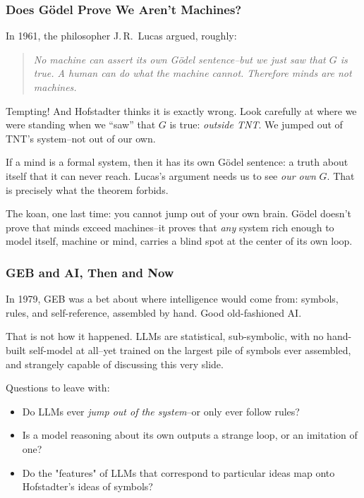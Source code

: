 \documentclass[aspectratio=169]{beamer}
\begin{document}
\begin{frame}[fragile]
  \frametitle{Does G\"odel Prove We Aren't Machines?}

  In 1961, the philosopher J.\,R.\ Lucas argued, roughly:

  \begin{quote}
    {\small\itshape No machine can assert its own G\"odel
    sentence--but we just saw that $G$ is true. A human can do what
    the machine cannot. Therefore minds are not machines.}
  \end{quote}

  \pause
  \vspace{\fill}

  Tempting! And Hofstadter thinks it is exactly wrong. Look carefully
  at where we were standing when we ``saw'' that $G$ is true:
  \textit{outside TNT}. We jumped out of TNT's system--not out of our
  own.

  \pause
  \vspace{\fill}

  If a mind is a formal system, then it has its own G\"odel
  sentence: a truth about itself that it can never reach. Lucas's
  argument needs us to see \textit{our own} $G$. That is precisely
  what the theorem forbids.

  \pause
  \vspace{\fill}

  The koan, one last time: you cannot jump out of your own brain.
  G\"odel doesn't prove that minds exceed machines--it proves that
  \textit{any} system rich enough to model itself, machine or mind,
  carries a blind spot at the center of its own loop.
\end{frame}

\begin{frame}[fragile]
  \frametitle{GEB and AI, Then and Now}


  In 1979, GEB was a bet about where intelligence would come from:
  symbols, rules, and self-reference, assembled by hand. Good
  old-fashioned AI.

  \pause
  \vspace{\fill}

  That is not how it happened. LLMs are statistical, sub-symbolic,
  with no hand-built self-model at all--yet trained on the largest
  pile of symbols ever assembled, and strangely capable of discussing
  this very slide.

  \pause
  \vspace{\fill}

  Questions to leave with:

  \begin{itemize}
    \item Do LLMs ever \textit{jump out of the system}--or only ever
      follow rules?
    \item Is a model reasoning about its own outputs a strange loop,
      or an imitation of one?
    \item Do the "features" of LLMs that correspond to particular ideas
    map onto Hofstadter's ideas of symbols?
  \end{itemize}
\end{frame}
\end{document}
